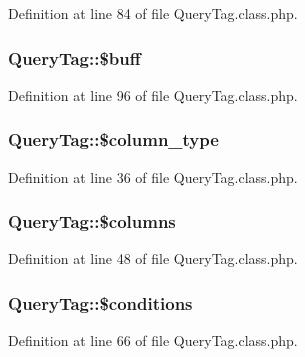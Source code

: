 Definition at line 84 of file Query\+Tag.\+class.\+php.

\hypertarget{classQueryTag_abe10d8fd334fac380dd5540b2c0bdcc8}{
\subsubsection[{\$buff}]{\setlength{\rightskip}{0pt plus 5cm}Query\+Tag\+::\$buff}}\label{classQueryTag_abe10d8fd334fac380dd5540b2c0bdcc8}


Definition at line 96 of file Query\+Tag.\+class.\+php.

\hypertarget{classQueryTag_a617db2d7a2db9fddba0959b43cc40458}{
\subsubsection[{\$column\+\_\+type}]{\setlength{\rightskip}{0pt plus 5cm}Query\+Tag\+::\$column\+\_\+type}}\label{classQueryTag_a617db2d7a2db9fddba0959b43cc40458}


Definition at line 36 of file Query\+Tag.\+class.\+php.

\hypertarget{classQueryTag_a375d57839b60d616ed27af9f42acd3a1}{
\subsubsection[{\$columns}]{\setlength{\rightskip}{0pt plus 5cm}Query\+Tag\+::\$columns}}\label{classQueryTag_a375d57839b60d616ed27af9f42acd3a1}


Definition at line 48 of file Query\+Tag.\+class.\+php.

\hypertarget{classQueryTag_a7cf9adc98dec4da0e67c1dcd25b7e5b5}{
\subsubsection[{\$conditions}]{\setlength{\rightskip}{0pt plus 5cm}Query\+Tag\+::\$conditions}}\label{classQueryTag_a7cf9adc98dec4da0e67c1dcd25b7e5b5}


Definition at line 66 of file Query\+Tag.\+class.\+php.

